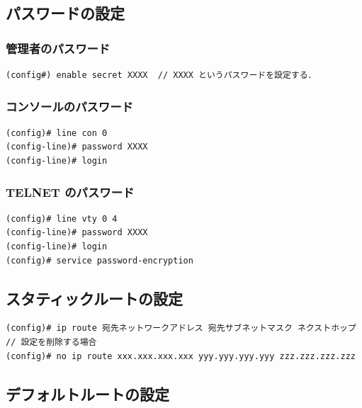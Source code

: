 \documentclass[uplatex,dvipdfmx]{bxjsarticle}
\begin{document}
\subsection{パスワードの設定}

\subsubsection{管理者のパスワード}

\begin{lstlisting}[caption={管理者のパスワード}]
(config#) enable secret XXXX  // XXXX というパスワードを設定する．
\end{lstlisting}

\subsubsection{コンソールのパスワード}

\begin{lstlisting}[caption={コンソールのパスワード}]
(config)# line con 0
(config-line)# password XXXX
(config-line)# login
\end{lstlisting}

\subsubsection{TELNET のパスワード}

\begin{lstlisting}[caption={TELNET のパスワード}]
(config)# line vty 0 4
(config-line)# password XXXX
(config-line)# login
(config)# service password-encryption
\end{lstlisting}

\subsection{スタティックルートの設定}

\begin{lstlisting}[caption={スタティックルートの設定}]
(config)# ip route 宛先ネットワークアドレス 宛先サブネットマスク ネクストホップ
// 設定を削除する場合
(config)# no ip route xxx.xxx.xxx.xxx yyy.yyy.yyy.yyy zzz.zzz.zzz.zzz
\end{lstlisting}

\subsection{デフォルトルートの設定}
\end{document}
